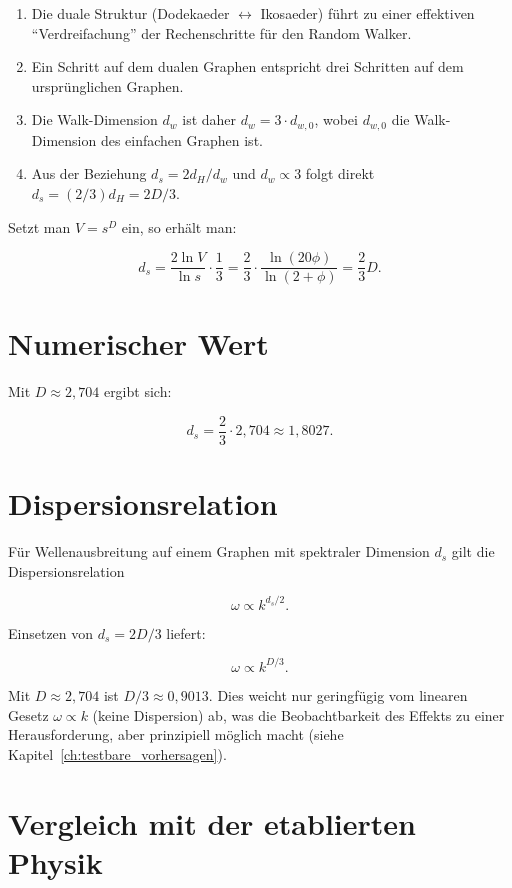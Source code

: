 \begin{enumerate}
    \item Die duale Struktur (Dodekaeder \(\leftrightarrow\) Ikosaeder)
          führt zu einer effektiven \enquote{Verdreifachung} der
          Rechenschritte für den Random Walker.
    \item Ein Schritt auf dem dualen Graphen entspricht drei Schritten
          auf dem ursprünglichen Graphen.
    \item Die Walk-Dimension \(d_w\) ist daher \(d_w = 3 \cdot d_{w,0}\),
          wobei \(d_{w,0}\) die Walk-Dimension des einfachen Graphen ist.
    \item Aus der Beziehung \(d_s = 2d_H/d_w\) und \(d_w \propto 3\)
          folgt direkt \(d_s = (2/3)d_H = 2D/3\).
\end{enumerate}

Setzt man \(V = s^D\) ein, so erhält man:

\[
d_s = \frac{2\ln V}{\ln s} \cdot \frac{1}{3}
    = \frac{2}{3} \cdot \frac{\ln(20\phi)}{\ln(2+\phi)}
    = \frac{2}{3} D.
\]

\section{Numerischer Wert}
\label{app:spektrale_numerisch}

Mit \(D \approx 2,704\) ergibt sich:

\[
d_s = \frac{2}{3} \cdot 2,704 \approx 1,8027.
\]

\section{Dispersionsrelation}
\label{app:spektrale_dispersion}

Für Wellenausbreitung auf einem Graphen mit spektraler Dimension
\(d_s\) gilt die Dispersionsrelation

\[
\omega \propto k^{d_s/2}.
\]

Einsetzen von \(d_s = 2D/3\) liefert:

\[
\omega \propto k^{D/3}.
\]

Mit \(D \approx 2,704\) ist \(D/3 \approx 0,9013\). Dies weicht nur
geringfügig vom linearen Gesetz \(\omega \propto k\) (keine Dispersion)
ab, was die Beobachtbarkeit des Effekts zu einer Herausforderung,
aber prinzipiell möglich macht (siehe Kapitel~\ref{ch:testbare_vorhersagen}).

\section{Vergleich mit der etablierten Physik}
\label{app:spektrale_vergleich}

